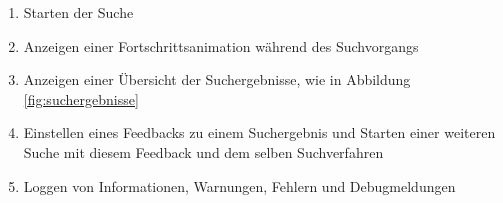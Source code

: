 \begin{enumerate} [label=\bfseries /F \arabic*0/, leftmargin=*]
	\newline
	\item Starten der Suche \label{f:suche_starten}
	\item Anzeigen einer Fortschrittsanimation während des Suchvorgangs \label{f:fortschrittsanimation}
	\newline
	\item Anzeigen einer \"Ubersicht der Suchergebnisse, wie in Abbildung \ref{fig:suchergebnisse} \label{f:suchergebnisse_anzeigen}
	\item Einstellen eines Feedbacks zu einem Suchergebnis und Starten einer weiteren Suche mit diesem Feedback und dem selben Suchverfahren \label{f:feedback}
	
	\item Loggen von Informationen, Warnungen, Fehlern und Debugmeldungen
	 
\end{enumerate}

